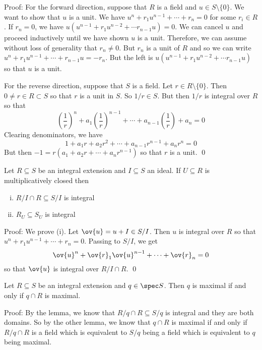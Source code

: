 \noindent Proof: For the forward direction, suppose that $R$ is a field and $u \in S \setminus \{0\}$. We want to show that $u$ is a unit. We have $u^n+r_1u^{n-1}+\cdots+r_n=0$ for some $r_i \in R$. If $r_n=0$, we have $u(u^{n-1}+r_1u^{n-2}+\cdots r_{n-1}u)=0$. We can cancel $u$ and proceed inductively until we have shown $u$ is a unit. Therefore, we can assume without loss of generality that $r_n \neq 0$. But $r_n$ is a unit of $R$ and so we can write $u^n+r_1u^{n-1}+\cdots+r_{n-1}u= -r_n$. But the left is $u(u^{n-1}+r_1u^{n-2}+\cdots r_{n-1}u)$ so that $u$ is a unit. 

For the reverse direction, suppose that $S$ is a field. Let $r \in R \setminus \{0\}$. Then $0 \neq r \in R \subset S$ so that $r$ is a unit in $S$. So $1/r \in S$. But then $1/r$ is integral over $R$ so that 
\[
\left(\frac{1}{r} \right)^n+a_1\left(\frac{1}{r} \right)^{n-1}+\cdots+a_{n-1}\left(\frac{1}{r} \right)+a_n=0
\]
Clearing denominators, we have
\[
1+a_1 r+a_2r^2+\cdots+a_{n-1}r^{n-1}+a_nr^n=0
\]
But then $-1=r(a_1+a_2r+\cdots+a_n r^{n-1})$ so that $r$ is a unit. \qed \\

\begin{lem}
Let $R \subseteq S$ be an integral extension and $I \subseteq S$ an ideal. If $U \subseteq R$ is multiplicatively closed then
\begin{enumerate}[(i)]
\item $R/I \cap R \subseteq S/I$ is integral 
\item $R_U \subseteq S_U$ is integral 
\end{enumerate}
\end{lem}

\noindent Proof: We prove (i). Let $\ov{u}=u+I \in S/I$. Then $u$ is integral over $R$ so that $u^n+r_1u^{n-1}+\cdots+r_n=0$. Passing to $S/I$, we get 
\[
\ov{u}^n+\ov{r}_1 \ov{u}^{n-1}+\cdots+\ov{r}_n=0
\]
so that $\ov{u}$ is integral over $R/I \cap R$. \qed \\

\begin{cor}
Let $R \subseteq S$ be an integral extension and $q \in \spec S$. Then $q$ is maximal if and only if $q \cap R$ is maximal. 
\end{cor}

\noindent Proof: By the lemma, we know that $R/q \cap R \subseteq S/q$ is integral and they are both domains. So by the other lemma, we know that $q \cap R$ is maximal if and only if $R/q \cap R$ is a field which is equivalent to $S/q$ being a field which is equivalent to $q$ being maximal. 

